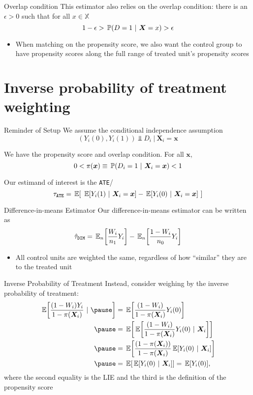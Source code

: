\documentclass[aspectratio=169,t,11pt,table]{beamer}
\begin{document}
\begin{frame}{Overlap condition}
  This estimator also relies on the overlap condition: there is an $\epsilon > 0$ such that for all $x \in \mathbb{X}$
  $$
    1 - \epsilon > \prob{D = 1}{\bm{X} = x} > \epsilon
  $$
  \begin{itemize}
    \item When matching on the propensity score, we also want the control group to have propensity scores along the full range of treated unit's propensity scores
  \end{itemize}
\end{frame}

\section{Inverse probability of treatment weighting}

\begin{frame}{Reminder of Setup}
  We assume the conditional independence assumption
  $$
    (Y_{i}(0), Y_{i}(1)) \Perp D_i \ \vert \ \bm{X}_i = \bm{x}
  $$

  We have the propensity score and overlap condition. For all $\bm{x}$,
  $$
    0 < \pi(\bm{x}) \equiv \prob{D_i = 1}{\bm{X}_i = \bm{x}} < 1
  $$

  Our estimand of interest is the \texttt{ATE}/
  $$
    \tau_{\texttt{ATE}} = \expec{\ \expec{Y_i(1)}{\bm{X}_i = \bm{x}} - \expec{Y_i(0)}{\bm{X}_i = \bm{x}} \ }
  $$
\end{frame}

\begin{frame}{Difference-in-means Estimator}
  Our difference-in-means estimator can be written as 
  $$
    \hat{\tau}_{\texttt{DIM}} = \expec[n]{\frac{W_i}{n_1} Y_i} - \expec[n]{\frac{1 - W_i}{n_0} Y_i}
  $$
  \begin{itemize}
    \item All control units are weighted the same, regardless of how ``similar'' they are to the treated unit
  \end{itemize}
\end{frame}

\begin{frame}{Inverse Probability of Treatment}
  Instead, consider weighing by the inverse probability of treatment:
  \begin{align*}
    \expec{\frac{(1 - W_i) Y_i}{1 - \pi(\bm{X}_i)}} \pause 
    &= \expec{\frac{(1 - W_i)}{1 - \pi(\bm{X}_i)} Y_i(0)} \\ \pause
    &= \expec{\expec{\frac{(1 - W_i) }{1 - \pi(\bm{X}_i)} Y_i(0)}{\bm{X}_i}} \\ \pause
    &= \expec{\frac{(1 - \pi(\bm{X}_i))}{1 - \pi(\bm{X}_i)} \expec{Y_i(0)}{\bm{X}_i}} \\ \pause
    &= \expec{\expec{Y_i(0)}{\bm{X}_i}} = \expec{Y_i(0)},
  \end{align*}
  where the second equality is the LIE and the third is the definition of the propensity score
\end{frame}
\end{document}
